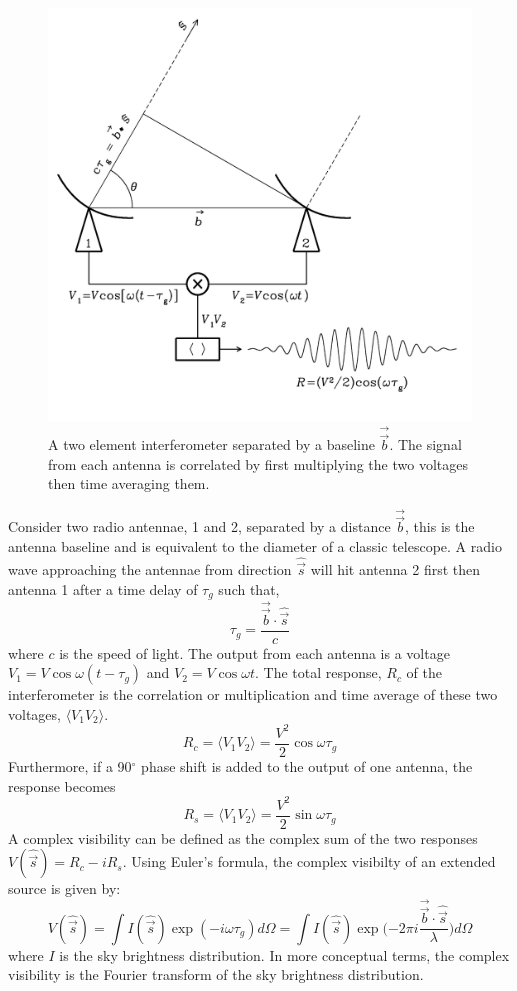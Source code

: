 \begin{figure}
    \centering
    \includegraphics[width=0.5\columnwidth]{Images/2_elem_int.png}
    \caption[A two element interferometer]{A two element interferometer separated by a baseline $\overrightarrow{\Vec{b}}$. The signal from each antenna is correlated by first multiplying the two voltages then time averaging them.}
    \label{fig:2_el_int}
\end{figure}

Consider two radio antennae, 1 and 2, separated by a distance $\overrightarrow{\Vec{b}}$, this is the antenna baseline and is equivalent to the diameter of a classic telescope. A radio wave approaching the antennae from direction $\hat{\Vec{s}}$  will hit antenna 2 first then antenna 1 after a time delay of $\tau_g$ such that,
$$\tau_g = \frac{\overrightarrow{\Vec{b}} \cdot \hat{\Vec{s}}}{c} $$
where $c$ is the speed of light. The output from each antenna is a voltage $V_1 = V \cos{\omega(t - \tau_g)}$ and $V_2 = V\cos{\omega t}$. The total response, $R_c$ of the interferometer is the correlation or multiplication and time average of these two voltages, $\langle V_1 V_2 \rangle$. 
$$
R_c = \langle V_1 V_2 \rangle = \frac{V^2}{2} \cos{\omega \tau_g}
$$
Furthermore, if a 90$^\circ$ phase shift is added to the output of one antenna, the response becomes
$$
R_s = \langle V_1 V_2 \rangle = \frac{V^2}{2} \sin{\omega \tau_g}
$$
A complex visibility can be defined as the complex sum of the two responses $V(\hat{\Vec{s}}) = R_c - iR_s$. Using Euler's formula, the complex visibilty of an extended source is given by:
\begin{equation}
\label{eq:complex_vis}
V(\hat{\Vec{s}}) = \int I(\hat{\Vec{s}}) \exp{(-i \omega \tau_g)} d\Omega = \int I(\hat{\Vec{s}}) \exp{(-2 \pi i \frac{\overrightarrow{\Vec{b}} \cdot \hat{\Vec{s}}}{\lambda}}) d\Omega
\end{equation}
where $I$ is the sky brightness distribution. In more conceptual terms, the complex visibility is the Fourier transform of the sky brightness distribution.

